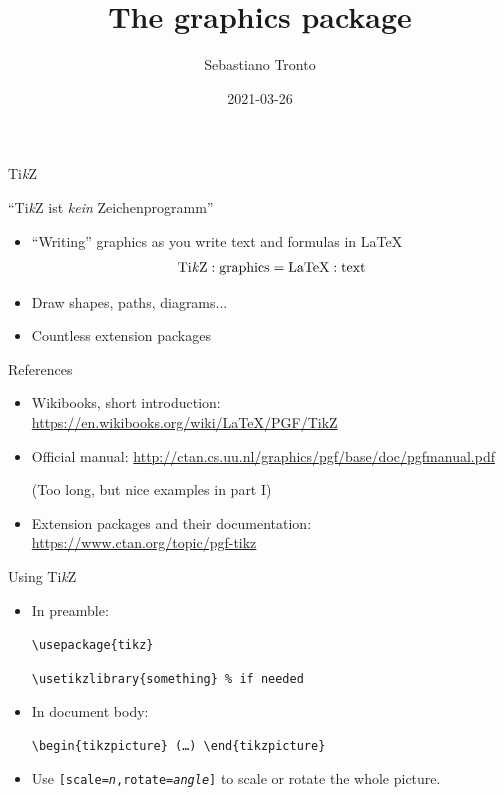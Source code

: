 \documentclass[11pt]{beamer}
\author[\texttt{sebastiano.tronto@uni.lu}]{Sebastiano Tronto}
\title{The {\ti } graphics package}
\date{2021-03-26}
\newcommand{\ti}{Ti\emph{k}Z}
\newcommand{\bs}{\textbackslash}
\begin{document}
\begin{frame}
  \titlepage
\end{frame}


\begin{frame}{\ti}
  \begin{center}
    ``{\ti } ist \emph{kein} Zeichenprogramm''
  \end{center}

  \vspace{1cm}
  \begin{itemize}
    \item ``Writing'' graphics as you write text and formulas in LaTeX
          \begin{align*}
            \text{\ti} : \text{graphics} = \text{LaTeX} : \text{text}
          \end{align*}
    \item Draw shapes, paths, diagrams...
    \item Countless extension packages
  \end{itemize}
\end{frame}

\begin{frame}{References}
  \begin{itemize}
    \item Wikibooks, short introduction:
          \url{https://en.wikibooks.org/wiki/LaTeX/PGF/TikZ}

    \vspace{0.2cm}
    \item Official manual:
        {\small\url{http://ctan.cs.uu.nl/graphics/pgf/base/doc/pgfmanual.pdf}}

          (Too long, but nice examples in part \textrm{I})

    \vspace{0.2cm}
    \item Extension packages and their documentation:
          \url{https://www.ctan.org/topic/pgf-tikz}
  \end{itemize}
\end{frame}

\begin{frame}{Using {\ti}}
  \begin{itemize}
    \item In preamble:
  
          \vspace{0.2cm}
          \texttt{\bs usepackage\{tikz\}}
  
          \texttt{\bs usetikzlibrary\{something\} \% if needed}
  
    \vspace{0.2cm}
    \item In document body:
    
          \vspace{0.2cm}
          \texttt{\bs begin\{tikzpicture\} (\dots) \bs end\{tikzpicture\}}

    \vspace{0.2cm}
    \item Use \texttt{[scale=\emph{n},rotate=\emph{angle}]} to scale or rotate
          the whole picture.
  \end{itemize}
\end{frame}
\end{document}
